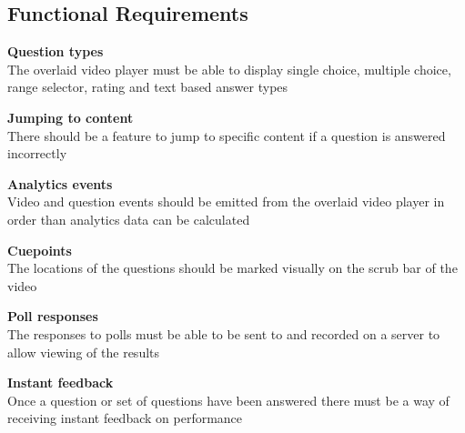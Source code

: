 \subsection{Functional Requirements}
\begin{requirement}[label=\textbf{F\arabic*}]
\item \textbf{Question types}  \hfill \\ The overlaid video player must be able to display single choice, multiple choice, range selector, rating and text based answer types\label{Req:Question types}
\item \textbf{Jumping to content} \hfill \\ There should be a feature to jump to specific content if a question is answered incorrectly \label{Req:Jumping to content}
\item \textbf{Analytics events} \hfill \\ Video and question events should be emitted from the overlaid video player in order than analytics data can be calculated \label{Req:Analytics events}
\item \textbf{Cuepoints} \hfill \\ The locations of the questions should be marked visually on the scrub bar of the video \label{Req:Cuepoints}
\item \textbf{Poll responses} \hfill \\ The responses to polls must be able to be sent to and recorded on a server to allow viewing of the results \label{Req:Poll responses}
\item \textbf{Instant feedback} \hfill \\ Once a question or set of questions have been answered there must be a way of receiving instant feedback on performance
\end{requirement}

